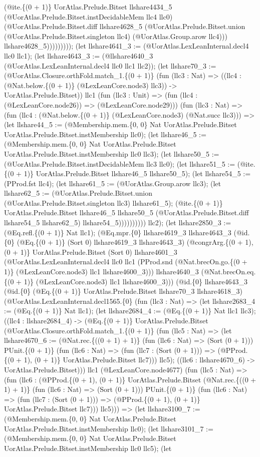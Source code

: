 \documentclass[11pt]{article}
\begin{document}
(@ite.\{(0 + 1)\} UorAtlas.Prelude.Bitset llshare4434\_5 (@UorAtlas.Prelude.Bitset.instDecidableMem llc4 llc0) (@UorAtlas.Prelude.Bitset.diff llshare4628\_5 (@UorAtlas.Prelude.Bitset.union (@UorAtlas.Prelude.Bitset.singleton llc4) (@UorAtlas.Group.arow llc4))) llshare4628\_5))))))))); (let llshare4641\_3 := (@UorAtlas.LexLeanInternal.decl4 llc0 llc1); (let llshare4643\_3 := (@llshare4640\_3 (@UorAtlas.LexLeanInternal.decl4 llc0 llc1 llc2)); (let llshare70\_3 := (@UorAtlas.Closure.orthFold.match\_1.\{(0 + 1)\} (fun (llc3 : Nat) => ((llc4 : (@Nat.below.\{(0 + 1)\} (@LexLeanCore.node3) llc3)) -> UorAtlas.Prelude.Bitset)) llc1 (fun (llc3 : Unit) => (fun (llc4 : (@LexLeanCore.node26)) => (@LexLeanCore.node29))) (fun (llc3 : Nat) => (fun (llc4 : (@Nat.below.\{(0 + 1)\} (@LexLeanCore.node3) (@Nat.succ llc3))) => (let llshare44\_5 := (@Membership.mem.\{0, 0\} Nat UorAtlas.Prelude.Bitset UorAtlas.Prelude.Bitset.instMembership llc0); (let llshare46\_5 := (@Membership.mem.\{0, 0\} Nat UorAtlas.Prelude.Bitset UorAtlas.Prelude.Bitset.instMembership llc0 llc3); (let llshare50\_5 := (@UorAtlas.Prelude.Bitset.instDecidableMem llc3 llc0); (let llshare51\_5 := (@ite.\{(0 + 1)\} UorAtlas.Prelude.Bitset llshare46\_5 llshare50\_5); (let llshare54\_5 := (PProd.fst llc4); (let llshare61\_5 := (@UorAtlas.Group.arow llc3); (let llshare62\_5 := (@UorAtlas.Prelude.Bitset.union (@UorAtlas.Prelude.Bitset.singleton llc3) llshare61\_5); (@ite.\{(0 + 1)\} UorAtlas.Prelude.Bitset llshare46\_5 llshare50\_5 (@UorAtlas.Prelude.Bitset.diff llshare54\_5 llshare62\_5) llshare54\_5)))))))))) llc2); (let llshare2850\_3 := (@Eq.refl.\{(0 + 1)\} Nat llc1); (@Eq.mpr.\{0\} llshare4619\_3 llshare4643\_3 (@id.\{0\} (@Eq.\{(0 + 1)\} (Sort 0) llshare4619\_3 llshare4643\_3) (@congrArg.\{(0 + 1), (0 + 1)\} UorAtlas.Prelude.Bitset (Sort 0) llshare4601\_3 (@UorAtlas.LexLeanInternal.decl4 llc0 llc1 (PProd.snd (@Nat.brecOn.go.\{(0 + 1)\} (@LexLeanCore.node3) llc1 llshare4600\_3))) llshare4640\_3 (@Nat.brecOn.eq.\{(0 + 1)\} (@LexLeanCore.node3) llc1 llshare4600\_3))) (@id.\{0\} llshare4643\_3 (@id.\{0\} (@Eq.\{(0 + 1)\} UorAtlas.Prelude.Bitset llshare70\_3 llshare4618\_3) (@UorAtlas.LexLeanInternal.decl1565.\{0\} (fun (llc3 : Nat) => (let llshare2683\_4 := (@Eq.\{(0 + 1)\} Nat llc1); (let llshare2684\_4 := (@Eq.\{(0 + 1)\} Nat llc1 llc3); ((llc4 : llshare2684\_4) -> (@Eq.\{(0 + 1)\} UorAtlas.Prelude.Bitset (@UorAtlas.Closure.orthFold.match\_1.\{(0 + 1)\} (fun (llc5 : Nat) => (let llshare4670\_6 := (@Nat.rec.\{((0 + 1) + 1)\} (fun (llc6 : Nat) => (Sort (0 + 1))) PUnit.\{(0 + 1)\} (fun (llc6 : Nat) => (fun (llc7 : (Sort (0 + 1))) => (@PProd.\{(0 + 1), (0 + 1)\} UorAtlas.Prelude.Bitset llc7))) llc5); ((llc6 : llshare4670\_6) -> UorAtlas.Prelude.Bitset))) llc1 (@LexLeanCore.node4677) (fun (llc5 : Nat) => (fun (llc6 : (@PProd.\{(0 + 1), (0 + 1)\} UorAtlas.Prelude.Bitset (@Nat.rec.\{((0 + 1) + 1)\} (fun (llc6 : Nat) => (Sort (0 + 1))) PUnit.\{(0 + 1)\} (fun (llc6 : Nat) => (fun (llc7 : (Sort (0 + 1))) => (@PProd.\{(0 + 1), (0 + 1)\} UorAtlas.Prelude.Bitset llc7))) llc5))) => (let llshare3100\_7 := (@Membership.mem.\{0, 0\} Nat UorAtlas.Prelude.Bitset UorAtlas.Prelude.Bitset.instMembership llc0); (let llshare3101\_7 := (@Membership.mem.\{0, 0\} Nat UorAtlas.Prelude.Bitset UorAtlas.Prelude.Bitset.instMembership llc0 llc5); (let 
\end{document}
